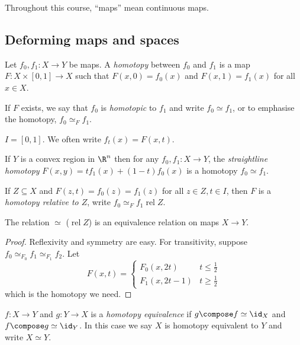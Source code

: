 \documentclass[a4paper]{article}
\DeclareMathOperator{\rel}{rel}
\begin{document}
Throughout this course, ``maps'' mean continuous maps.

\subsection{Deforming maps and spaces}

\begin{definition}[homotopy]
  Let \(f_0, f_1: X \to Y\) be maps. A \emph{homotopy} between \(f_0\) and \(f_1\) is a map \(F: X \times [0, 1] \to X\) such that \(F(x, 0) = f_0(x)\) and \(F(x, 1) = f_1(x)\) for all \(x \in X\).

  If \(F\) exists, we say that \(f_0\) is \emph{homotopic} to \(f_1\) and write \(f_0 \simeq f_1\), or to emphasise the homotopy, \(f_0 \simeq_F f_1\).
\end{definition}

\begin{notation}
  \(I = [0, 1]\). We often write \(f_t(x) = F(x, t)\).
\end{notation}

\begin{eg}
  If \(Y\) is a convex region in \(\R^n\) then for any \(f_0, f_1: X \to Y\), the \emph{straightline homotopy} \(F(x, y) = t f_1(x) + (1 - t) f_0(x)\) is a homotopy \(f_0 \simeq f_1\).
\end{eg}

\begin{definition}
  If \(Z \subseteq X\) and \(F(z, t) = f_0(z) = f_1(z)\) for all \(z \in Z, t \in I\), then \(F\) is a \emph{homotopy relative to \(Z\)}, write \(f_0 \simeq_F f_1 \rel Z\).
\end{definition}

\begin{lemma}
  The relation \(\simeq\) (\(\rel Z\)) is an equivalence relation on maps \(X \to Y\).
\end{lemma}

\begin{proof}
  Reflexivity and symmetry are easy. For transitivity, suppose \(f_0 \simeq_{F_0} f_1 \simeq_{F_1} f_2\). Let
  \[
    F(x, t) =
    \begin{cases}
      F_0(x, 2t) & t \leq \frac{1}{2} \\
      F_1(x, 2t - 1) & t \geq \frac{1}{2}
    \end{cases}
  \]
  which is the homotopy we need.
\end{proof}

\begin{definition}
  \(f: X \to Y\) and \(g: Y \to X\) is a \emph{homotopy equivalence} if \(g \compose f \simeq \id_X\) and \(f \compose g \simeq \id_Y\). In this case we say \(X\) is homotopy equivalent to \(Y\) and write \(X \simeq Y\).
\end{definition}
\end{document}
